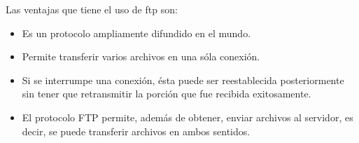 Las ventajas que tiene el uso de ftp son:
\begin{itemize}
\item Es un protocolo ampliamente difundido en el mundo.
\item Permite transferir varios archivos en una sóla conexión.
\item Si se interrumpe una conexión, ésta puede ser reestablecida posteriormente sin tener que retransmitir la porción que fue recibida exitosamente.
\item El protocolo FTP permite, además de obtener, enviar archivos al servidor, es decir, se puede transferir archivos en ambos sentidos.
\end{itemize}